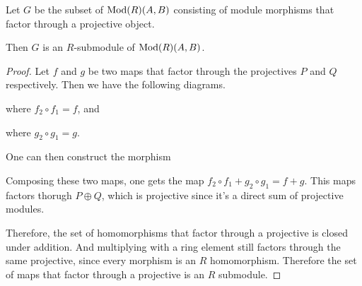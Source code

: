 \begin{lemma}
    \label{lem:morphisms_factoring_through_projectives_r-submodule}
    Let \( G \) be the subset of \( \operatorname{Mod}(R)(A, B) \) consisting of module morphisms that factor through a projective object.

    Then \( G \) is an \( R \)-submodule of \( \operatorname{Mod}(R)(A, B) \).
\end{lemma}
\begin{proof}
    Let \( f \) and \( g \) be two maps that factor through the projectives \( P \) and \( Q \) respectively. Then we have the following diagrams.

    \begin{center}
    \end{center}
    where \( f_2 \circ f_1 = f \), and
    \begin{center}
    \end{center}
    where \( g_2 \circ g_1 = g \).

    One can then construct the morphism
    \begin{center}
    \end{center}

    Composing these two maps, one gets the map \( f_2 \circ f_1 + g_2 \circ g_1 = f + g \). This maps factors thorugh \( P \oplus Q \), which is projective since it's a direct sum of projective modules.

    Therefore, the set of homomorphisms that factor through a projective is closed under addition. And multiplying with a ring element still factors through the same projective, since every morphism is an \( R \) homomorphism. Therefore the set of maps that factor through a projective is an \( R \) submodule.
\end{proof}


